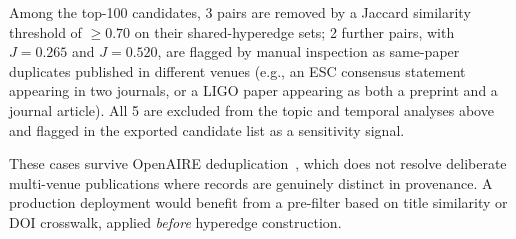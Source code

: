 Among the top-100 candidates, 3 pairs are removed by a Jaccard
similarity threshold of $\geq 0.70$ on their shared-hyperedge sets;
2 further pairs, with $J = 0.265$ and $J = 0.520$, are flagged by
manual inspection as same-paper duplicates published in different
venues (e.g., an ESC consensus statement appearing in two journals,
or a LIGO paper appearing as both a preprint and a journal article).
All 5 are excluded from the topic and temporal analyses above and
flagged in the exported candidate list as a sensitivity signal.

These cases survive OpenAIRE deduplication~\cite{openaire_dedup},
which does not resolve deliberate multi-venue publications where
records are genuinely distinct in provenance.  A production deployment
would benefit from a pre-filter based on title similarity or DOI
crosswalk, applied \emph{before} hyperedge construction.
